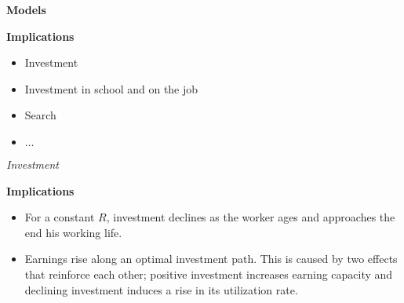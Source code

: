 \begin{frame}\begin{center}
	\LARGE\textbf{Models}
\end{center}\end{frame}
\begin{frame}\textbf{Implications}\vspace{0.3cm}

\begin{itemize}\setlength\itemsep{1em}
\item Investment
\item Investment in school and on the job
\item Search
\item $\hdots$
\end{itemize}

\end{frame}
\begin{frame}\begin{center}
	\LARGE\textit{Investment}
\end{center}\end{frame}
\begin{frame}\textbf{Implications}\vspace{0.3cm}

\begin{itemize}\setlength\itemsep{1em}
\item For a constant $R$, investment declines as the worker ages and approaches the end his working life.
\item Earnings rise along an optimal investment path. This is caused by two effects that reinforce each other; positive investment increases earning capacity and declining investment induces a rise in its utilization rate.
\end{itemize}

\end{frame}
